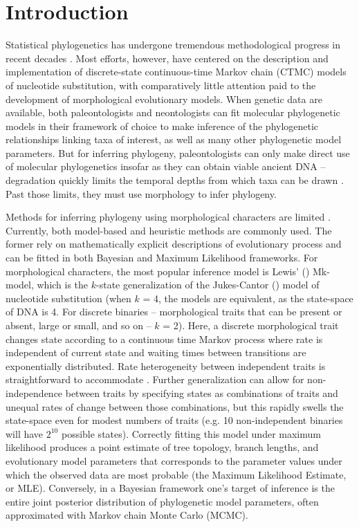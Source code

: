 \clearpage

\section{Introduction}

Statistical phylogenetics has undergone tremendous methodological progress in recent decades \citep{hollandRiseStatisticalPhylogenetics2013}. Most efforts, however, have centered on the description and implementation of discrete-state continuous-time Markov chain (CTMC) models of nucleotide substitution, with comparatively little attention paid to the development of morphological evolutionary models. When genetic data are available, both paleontologists and neontologists can fit molecular phylogenetic models in their framework of choice to make inference of the phylogenetic relationships linking taxa of interest, as well as many other phylogenetic model parameters. But for inferring phylogeny, paleontologists can only make direct use of molecular phylogenetics insofar as they can obtain viable ancient DNA – degradation quickly limits the temporal depths from which taxa can be drawn \citep{collinsSurvivalOrganicMatter2002, allentoftHalflifeDNABone2012, pickrellNewHistoryGeography2014}. Past those limits, they must use morphology to infer phylogeny.

Methods for inferring phylogeny using morphological characters are limited \citep{hollandRiseStatisticalPhylogenetics2013, leeMorphologicalPhylogeneticsGenomic2015}. Currently, both model-based and heuristic methods are commonly used. The former rely on mathematically explicit descriptions of evolutionary process and can be fitted in both Bayesian and Maximum Likelihood frameworks. For morphological characters, the most popular inference model is Lewis’ (\citeyear{lewisLikelihoodApproachEstimating2001}) Mk-model, which is the $k$-state generalization of the Jukes-Cantor (\citeyear{jukesEvolutionProteinMolecules1969}) model of nucleotide substitution (when $k$ = 4, the models are equivalent, as the state-space of DNA is 4. For discrete binaries – morphological traits that can be present or absent, large or small, and so on – $k$ = 2). Here, a discrete morphological trait changes state according to a continuous time Markov process where rate is independent of current state and waiting times between transitions are exponentially distributed. Rate heterogeneity between independent traits is straightforward to accommodate \citep{wrightModelingCharacterChange2016}. Further generalization can allow for non-independence between traits by specifying states as combinations of traits and unequal rates of change between those combinations, but this rapidly swells the state-space even for modest numbers of traits (e.g. 10 non-independent binaries will have $2^{10}$ possible states). Correctly fitting this model under maximum likelihood produces a point estimate of tree topology, branch lengths, and evolutionary model parameters that corresponds to the parameter values under which the observed data are most probable (the Maximum Likelihood Estimate, or MLE). Conversely, in a Bayesian framework one's target of inference is the entire joint posterior distribution of phylogenetic model parameters, often approximated with Markov chain Monte Carlo (MCMC).

